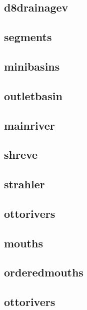 \documentclass[
]{book}
\theoremstyle{definition}
\theoremstyle{definition}
\theoremstyle{definition}
\theoremstyle{definition}
\theoremstyle{remark}
\begin{document}
\subsection{d8drainagev}\label{d8drainagev}

\subsection{segments}\label{segments}

\subsection{minibasins}\label{minibasins}

\subsection{outletbasin}\label{outletbasin}

\subsection{mainriver}\label{mainriver}

\subsection{shreve}\label{shreve}

\subsection{strahler}\label{strahler}

\subsection{ottorivers}\label{ottorivers}

\subsection{mouths}\label{mouths}

\subsection{orderedmouths}\label{orderedmouths}

\subsection{ottorivers}\label{ottorivers}
\end{document}
